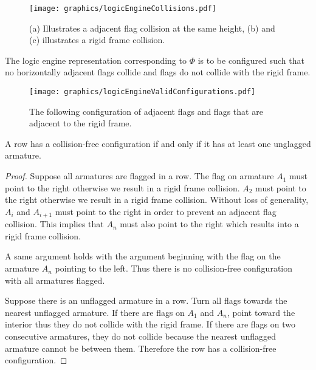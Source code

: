 \begin{figure}[!htbp]
\begin{center}
\texttt{[image: graphics/logicEngineCollisions.pdf]}
\caption{(a) Illustrates a adjacent flag collision at the same height, (b) and (c) illustrates a 
rigid frame collision.}\label{fig:logicEngineCollisions.pdf}
\end{center}
\end{figure}
The logic engine representation corresponding to $\Phi$ is to be configured such that no 
horizontally adjacent flags collide and flags do not collide with the rigid frame. 
\begin{figure}[!htbp]
\begin{center}
\texttt{[image: graphics/logicEngineValidConfigurations.pdf]}
\caption{The following configuration of adjacent flags 
and flags that are adjacent to the rigid frame.}\label{fig:logicEngineValidConfigurations.pdf}
\end{center}
\end{figure}

\begin{lem}\label{lem:logicEngine1}A row has a collision-free configuration if and only if it has 
at least one unglagged armature. \end{lem}
\begin{proof}

Suppose all armatures are flagged in a row.  The flag on armature $A_1$ must point to the 
right otherwise we result in a rigid frame collision.  $A_2$ must point to the right otherwise 
we result in a rigid frame collision.  Without loss of generality, $A_i$ and $A_{i+1}$ must 
point to the right in order to prevent an adjacent flag collision.  This implies that $A_n$ 
must also point to the right which results into a rigid frame collision.

A same argument holds with the argument beginning with the flag 
on the armature $A_n$ pointing to the left.  Thus there is no collision-free configuration with 
all armatures flagged.


Suppose there is an unflagged armature in a row.  Turn all flags towards the nearest unflagged 
armature.  If there are flags on $A_1$ and $A_n$, point toward the interior thus they do not 
collide with the rigid frame.  If there are flags on two consecutive armatures, they do not collide 
because the nearest unflagged armature cannot be between them.  Therefore the row has a 
collision-free configuration.
\end{proof}

